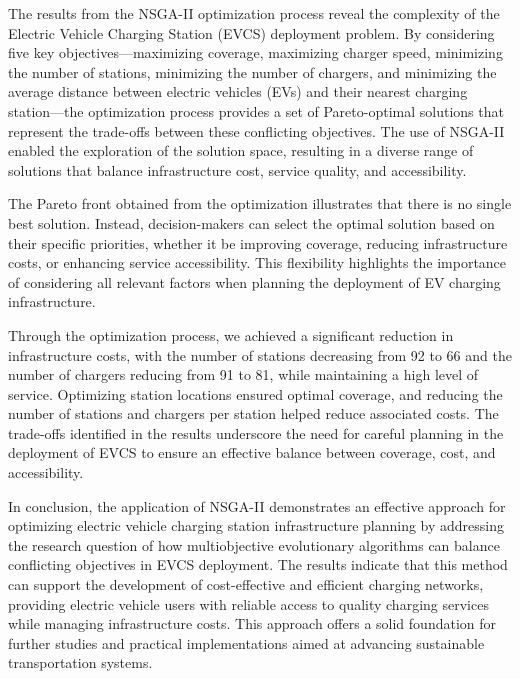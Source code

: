 The results from the NSGA-II optimization process reveal the complexity of the Electric Vehicle Charging Station (EVCS) deployment problem. By considering five key objectives—maximizing coverage, maximizing charger speed, minimizing the number of stations, minimizing the number of chargers, and minimizing the average distance between electric vehicles (EVs) and their nearest charging station—the optimization process provides a set of Pareto-optimal solutions that represent the trade-offs between these conflicting objectives. The use of NSGA-II enabled the exploration of the solution space, resulting in a diverse range of solutions that balance infrastructure cost, service quality, and accessibility.

The Pareto front obtained from the optimization illustrates that there is no single best solution. Instead, decision-makers can select the optimal solution based on their specific priorities, whether it be improving coverage, reducing infrastructure costs, or enhancing service accessibility. This flexibility highlights the importance of considering all relevant factors when planning the deployment of EV charging infrastructure.

Through the optimization process, we achieved a significant reduction in infrastructure costs, with the number of stations decreasing from 92 to 66 and the number of chargers reducing from 91 to 81, while maintaining a high level of service. Optimizing station locations ensured optimal coverage, and reducing the number of stations and chargers per station helped reduce associated costs. The trade-offs identified in the results underscore the need for careful planning in the deployment of EVCS to ensure an effective balance between coverage, cost, and accessibility.

In conclusion, the application of NSGA-II demonstrates an effective approach for optimizing electric vehicle charging station infrastructure planning by addressing the research question of how multiobjective evolutionary algorithms can balance conflicting objectives in EVCS deployment. The results indicate that this method can support the development of cost-effective and efficient charging networks, providing electric vehicle users with reliable access to quality charging services while managing infrastructure costs. This approach offers a solid foundation for further studies and practical implementations aimed at advancing sustainable transportation systems.

